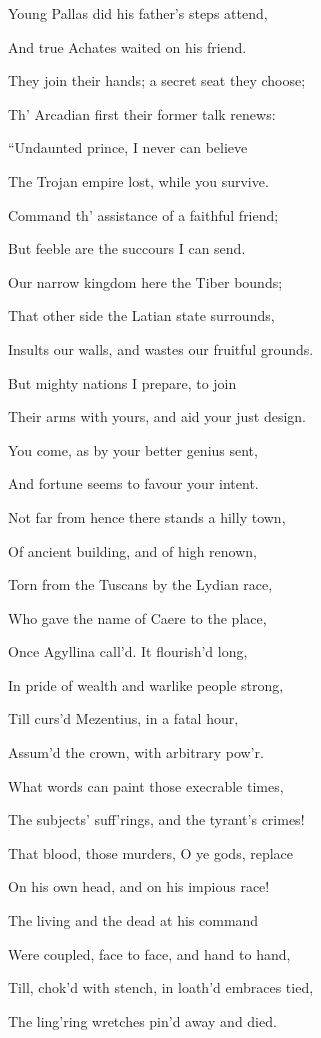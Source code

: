 Young Pallas did his father’s steps attend,

And true Achates waited on his friend.

They join their hands; a secret seat they choose;

Th’ Arcadian first their former talk renews:

“Undaunted prince, I never can believe

The Trojan empire lost, while you survive.

Command th’ assistance of a faithful friend;

But feeble are the succours I can send.

Our narrow kingdom here the Tiber bounds;

That other side the Latian state surrounds,

Insults our walls, and wastes our fruitful grounds.

But mighty nations I prepare, to join

Their arms with yours, and aid your just design.

You come, as by your better genius sent,

And fortune seems to favour your intent.

Not far from hence there stands a hilly town,

Of ancient building, and of high renown,

Torn from the Tuscans by the Lydian race,

Who gave the name of Caere to the place,

Once Agyllina call’d. It flourish’d long,

In pride of wealth and warlike people strong,

Till curs’d Mezentius, in a fatal hour,

Assum’d the crown, with arbitrary pow’r.

What words can paint those execrable times,

The subjects’ suff’rings, and the tyrant’s crimes!

That blood, those murders, O ye gods, replace

On his own head, and on his impious race!

The living and the dead at his command

Were coupled, face to face, and hand to hand,

Till, chok’d with stench, in loath’d embraces tied,

The ling’ring wretches pin’d away and died.

